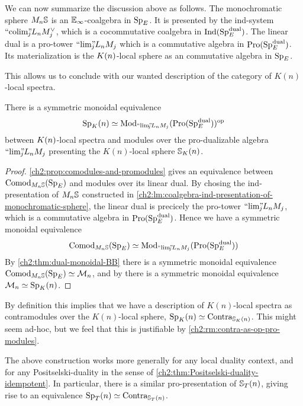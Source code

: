 We can now summarize the discussion above as follows. The monochromatic sphere $M_n\S$ is an $\E_\infty$-coalgebra in $\SpE$. It is presented by the ind-system $\indcolim L_n M_j^\vee$, which is a cocommutative coalgebra in $\Ind(\SpE\dual)$. The linear dual is a pro-tower $\prolim L_n M_j$ which is a commutative algebra in $\Pro(\SpE\dual)$. Its materialization is the $\Kn$-local sphere as an commutative algebra in $\SpE$. 

This allows us to conclude with our wanted description of the category of $K(n)$-local spectra. 

\begin{theorem}
    \label{ch2:thm:Kn-is-pro-modules}
    There is a symmetric monoidal equivalence 
    \[\Sp_\Kn \simeq \Mod_{\prolim L_n M_j}(\Pro(\SpE\dual))\op\]
    between $\Kn$-local spectra and modules over the pro-dualizable algebra $\prolim L_n M_j$ presenting the $K(n)$-local sphere $\S_\Kn$. 
\end{theorem}
\begin{proof}
    \cref{ch2:prop:comodules-and-promodules} gives an equivalence between $\Comod_{M_n \S}(\SpE)$ and modules over its linear dual. By chosing the ind-presentation of $M_n \S$ constructed in \cref{ch2:lm:coalgebra-ind-presentation-of-monochromatic-sphere}, the linear dual is precicely the pro-tower $\prolim L_n M_j$, which is a commutative algebra in $\Pro(\SpE\dual)$. Hence we have a symmetric monoidal equivalence 
    \[\Comod_{M_n\S}(\SpE)\simeq \Mod_{\prolim L_n M_j}(\Pro(\SpE\dual))\]
    By \cref{ch2:thm:dual-monoidal-BB} there is a symmetric monoidal equivalence $\Comod_{M_n\S}(\SpE)\simeq \Mn$, and by \cite[6.19]{hovey-strickland_99} there is a symmetric monoidal equivalence $\Mn \simeq \Sp_\Kn$. 
\end{proof}

\begin{remark}
    By definition this implies that we have a description of $K(n)$-local spectra as contramodules over the $K(n)$-local sphere, $\Sp_\Kn \simeq \Contra_{\S_\Kn}$. This might seem ad-hoc, but we feel that this is justifiable by \cref{ch2:rm:contra-as-op-pro-modules}.
\end{remark}

\begin{remark}
    The above construction works more generally for any local duality context, and for any Positselski-duality in the sense of \cref{ch2:thm:Positselski-duality-idempotent}. In particular, there is a similar pro-presentation of $\S_\Tn$, giving rise to an equivalence $\Sp_\Tn\simeq \Contra_{\S_\Tn}$.
\end{remark}

